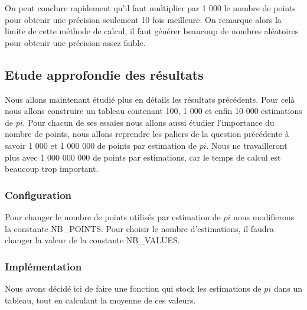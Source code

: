 \documentclass[a4paper]{article}
\begin{document}
On peut conclure rapidement qu'il faut multiplier par 1 000 le nombre de points pour obtenir une précision seulement 10 fois meilleure.
On remarque alors la limite de cette méthode de calcul, il faut générer beaucoup de nombres aléatoires pour obtenir une précision assez faible.

\subsection{Etude approfondie des résultats}
Nous allons maintenant étudié plus en détails les résultats précédents. Pour celà nous allons construire un tableau contenant 100, 1 000 et enfin 10 000 estimations de $pi$. 
Pour chacun de ses essaies nous allons aussi étudier l'importance du nombre de points, nous allons reprendre les paliers de la question précédente à savoir 1 000 et 1 000 000 de points par estimation de $pi$.
Nous ne travailleront plus avec 1 000 000 000 de points par estimations, car le temps de calcul est beaucoup trop important.

\subsubsection{Configuration}
Pour changer le nombre de points utilisés par estimation de $pi$
nous modifierons la constante NB\_POINTS.
Pour choisir le nombre d'estimations, 
il faudra changer la valeur de la constante NB\_VALUES.

\begin{mdframed}[backgroundcolor=light-gray, roundcorner=20pt,
	leftmargin=-45, rightmargin=-45, 
	innerleftmargin=20, innertopmargin=1, innerbottommargin=1, 
	outerlinewidth=1, linecolor=darkgray]
	
\end{mdframed}

\begin{mdframed}[backgroundcolor=light-gray, roundcorner=20pt,
	leftmargin=-45, rightmargin=-45, 
	innerleftmargin=20, innertopmargin=1, innerbottommargin=1, 
	outerlinewidth=1, linecolor=darkgray]
	
\end{mdframed}

\subsubsection{Implémentation}

Nous avons décidé ici de faire une fonction qui stock les estimations de $pi$ dans un tableau, tout en calculant la moyenne de ces valeurs.
\end{document}
